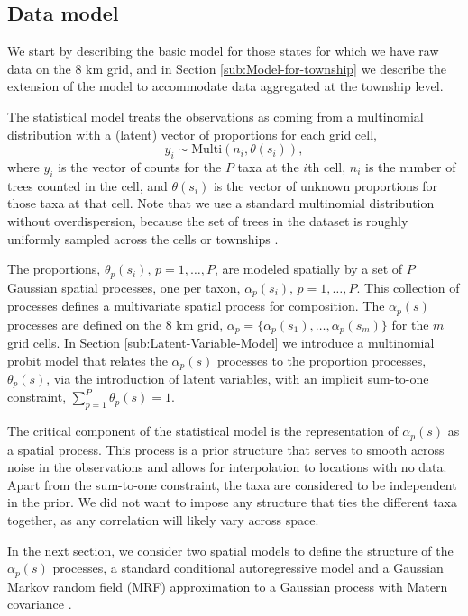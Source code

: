 \documentclass[12pt]{article}
\begin{document}
\subsection{Data model}

We start by describing the basic model for those states for which
we have raw data on the 8 km grid, and in Section \ref{sub:Model-for-township}
we describe the extension of the model to accommodate data aggregated
at the township level.

The statistical model treats the observations as coming from a multinomial
distribution with a (latent) vector of proportions for each grid cell,
\[
y_{i}\sim\mbox{Multi}(n_{i},\theta(s_{i})),
\]
where $y_{i}$ is the vector of counts for the $P$ taxa at the $i$th
cell, $n_{i}$ is the number of trees counted in the cell, and $\theta(s_{i})$
is the vector of unknown proportions for those taxa at that cell.
Note that we use a standard multinomial distribution without overdispersion,
because the set of trees in the dataset is roughly uniformly sampled
across the cells or townships \citep{goring2015composition}.

The proportions, $\theta_{p}(s_{i}),\, p=1,\ldots,P$, are modeled
spatially by a set of $P$ Gaussian spatial processes, one per taxon,
$\alpha_{p}(s_{i}),\, p=1,\ldots,P$. This collection of processes
defines a multivariate spatial process for composition. The $\alpha_{p}(s)$
processes are defined on the 8 km grid, $\alpha_{p}=\{\alpha_{p}(s_{1}),\ldots,\alpha_{p}(s_{m})\}$
for the $m$ grid cells. In Section \ref{sub:Latent-Variable-Model}
we introduce a multinomial probit model that relates the $\alpha_{p}(s)$
processes to the proportion processes, $\theta_{p}(s)$, via the introduction
of latent variables, with an implicit sum-to-one constraint, $\sum_{p=1}^{P}\theta_{p}(s)=1$.



The critical component of the statistical model is the representation
of $\alpha_{p}(s)$ as a spatial process. This process is a prior
structure that serves to smooth across noise in the observations and
allows for interpolation to locations with no data. Apart from the
sum-to-one constraint, the taxa are considered to be independent in
the prior. We did not want to impose any structure that ties the different
taxa together, as any correlation will likely vary across space.

In the next section, we consider two spatial models to define the
structure of the $\alpha_{p}(s)$ processes, a standard conditional
autoregressive model \citep{Bane:etal:2004} and a Gaussian Markov
random field (MRF) approximation to a Gaussian process with Matern
covariance \citep{Lind:etal:2011}. 
\end{document}
